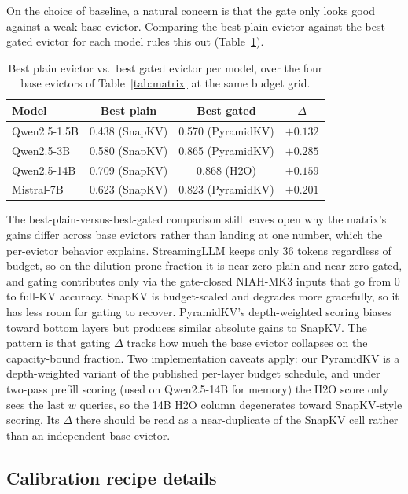 On the choice of baseline, a natural concern is that the gate only
looks good against a weak base evictor. Comparing the best plain
evictor against the best gated evictor for each model rules this out
(Table~\ref{tab:bestplain}).

\begin{table}[t]
\centering
\caption{Best plain evictor vs.\ best gated evictor per model, over
the four base evictors of Table~\ref{tab:matrix} at the same budget grid.}
\label{tab:bestplain}
\begin{tabular}{lccc}
\toprule
Model & Best plain & Best gated & $\Delta$ \\
\midrule
Qwen2.5-1.5B & 0.438 (SnapKV)    & 0.570 (PyramidKV) & $+0.132$ \\
Qwen2.5-3B   & 0.580 (SnapKV)    & 0.865 (PyramidKV) & $+0.285$ \\
Qwen2.5-14B  & 0.709 (SnapKV)    & 0.868 (H2O)       & $+0.159$ \\
Mistral-7B    & 0.623 (SnapKV)    & 0.823 (PyramidKV) & $+0.201$ \\
\bottomrule
\end{tabular}
\end{table}

The best-plain-versus-best-gated comparison still leaves open why the
matrix's gains differ across base evictors rather than landing at one
number, which the per-evictor behavior explains. StreamingLLM keeps only
$36$ tokens regardless of budget, so on the dilution-prone fraction it is
near zero plain and near zero gated, and gating contributes only via the
gate-closed NIAH-MK3 inputs that go from $0$ to full-KV accuracy. SnapKV
is budget-scaled and degrades more gracefully, so it has less room for
gating to recover. PyramidKV's depth-weighted scoring biases toward
bottom layers but produces similar absolute gains to SnapKV. The pattern
is that gating $\Delta$ tracks how much the base evictor collapses on
the capacity-bound fraction. Two implementation caveats apply: our
PyramidKV is a depth-weighted variant of the published per-layer budget
schedule, and under two-pass prefill scoring (used on Qwen2.5-14B for
memory) the H2O score only sees the last $w$ queries, so the 14B H2O
column degenerates toward SnapKV-style scoring. Its $\Delta$ there
should be read as a near-duplicate of the SnapKV cell rather than an
independent base evictor.

\subsection{Calibration recipe details}
\label{subsec:recipe-details}

